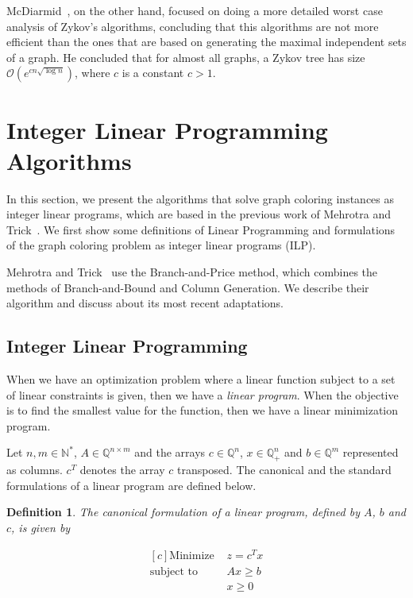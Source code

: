 \documentclass[fleqn,10pt]{SelfArx} %
\newtheorem{defin}{Definition}
\newcommand{\cO}{\mathcal{O}}
\begin{document}
	McDiarmid~\cite{McDiarmid1979}, on the other hand, focused on doing a more
	detailed worst case analysis of Zykov's algorithms, concluding that
	this algorithms are not more efficient than the ones that are based on
	generating the maximal independent sets of a graph. He concluded that
	for almost all graphs, a Zykov tree has size $\cO(e^{cn
		\sqrt{\log n}})$, where $c$ is a constant $c>1$.
	
	\section{Integer Linear Programming Algorithms}\label{sec:lp}
	
	In this section, we present the algorithms that solve graph coloring
	instances as integer linear programs, which are based in the previous
	work of Mehrotra and Trick~\cite{Mehrotra95}. We first show some definitions of
	Linear Programming and formulations of the graph coloring problem as
	integer linear programs (ILP).
	
	Mehrotra and Trick~\cite{Mehrotra95} use the Branch-and-Price method, which combines the methods of Branch-and-Bound and Column Generation. We describe their algorithm and
	discuss about its most recent adaptations.
	
	\subsection{Integer Linear Programming}
	
	When we have an optimization problem where a linear function subject
	to a set of linear constraints is given, then we have a \emph{linear
		program}. When the objective is to find the smallest value for the
	function, then we have a linear minimization program.
	
	Let $n,m \in \mathbb{N}^*$, $A \in \mathbb{Q}^{n \times m}$ and the arrays $c \in
	\mathbb{Q}^n$, $x \in \mathbb{Q}^n_{+}$ and $b \in \mathbb{Q}^m$
	represented as columns. $c^T$ denotes the array $c$ transposed. The canonical and the standard formulations of a linear program are
	defined below.
	
	\begin{defin} The canonical formulation of a linear program, defined
		by $A$, $b$ and $c$, is given by
		
		\begin{equation*}
		\begin{aligned}[c] \text{Minimize } & z = c^{T}x\\ \text{subject to }&
		Ax \geq b\\ & x \geq 0
		\end{aligned}
		\end{equation*}\label{def:1a}
	\end{defin}
	
\end{document}

